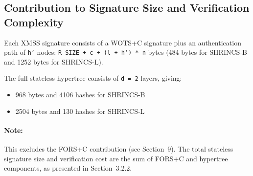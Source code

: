\subsection{Contribution to Signature Size and Verification Complexity}
Each XMSS signature consists of a WOTS+C signature plus an authentication path of \texttt{h'} nodes: \texttt{R\_SIZE + c + (l + h') * n} bytes (484 bytes for SHRINCS-B and 1252 bytes for SHRINCS-L).

The full stateless hypertree consists of \texttt{d = 2} layers, giving:
\begin{itemize}
    \item 968 bytes and 4106 hashes for SHRINCS-B
    \item 2504 bytes and 130 hashes for SHRINCS-L
\end{itemize}

\paragraph{Note:} This excludes the FORS+C contribution (see Section~9). The total stateless signature size and verification cost are the sum of FORS+C and hypertree components, as presented in Section~3.2.2.